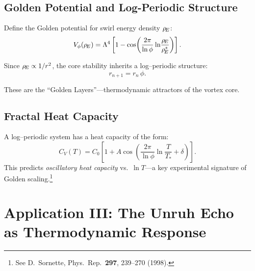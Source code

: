 \documentclass[11pt]{article}
\begin{document}
        \subsection{Golden Potential and Log-Periodic Structure}

            Define the Golden potential for swirl energy density $\rho_{\!E}$:
            \begin{equation}
                V_\phi(\rho_{\!E})
                = \Lambda^4 \left[
                                1 - \cos\!\left(
                                              \frac{2\pi}{\ln\phi}
                                              \ln\!\frac{\rho_{\!E}}{\rho_{\!E}^\ast}
                    \right) \right].
            \end{equation}

            Since $\rho_{\!E} \propto 1/r^2$, the core stability inherits a log--periodic
            structure:
            \begin{equation}
                r_{n+1} = r_n\,\phi.
            \end{equation}

            These are the ``Golden Layers''---thermodynamic attractors of the vortex core.

        \subsection{Fractal Heat Capacity}

            A log--periodic system has a heat capacity of the form:
            \begin{equation}
                C_V(T)
                = C_0 \left[
                          1 + A \cos\!\left(
                                          \frac{2\pi}{\ln\phi}
                                          \ln\!\frac{T}{T_\ast}
                                          + \delta
                    \right)
                \right].
            \end{equation}
            This predicts \emph{oscillatory heat capacity} vs.\ $\ln T$---a key experimental
            signature of Golden scaling.\footnote{%
        See D.~Sornette, Phys.\ Rep.\ \textbf{297}, 239--270 (1998).}

    \section{Application III: The Unruh Echo as Thermodynamic Response}
\end{document}
